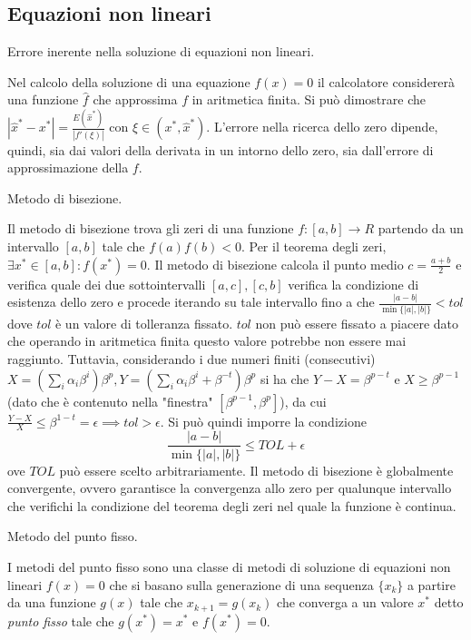 \documentclass[answers, a4paper]{exam}
\begin{document}
\begin{questions}
\section{Equazioni non lineari}
	\question Errore inerente nella soluzione di equazioni non lineari.
	\begin{solution}
		Nel calcolo della soluzione di una equazione $f(x) = 0$ il calcolatore considererà una funzione $\hat{f}$ che approssima $f$ in aritmetica finita. 
		Si può dimostrare che $|\hat{x}^* - x^*| = \frac{E(\hat{x}^*)}{|f'(\xi)|} $ con $\xi \in (x^*, \hat{x}^*)$.
		L'errore nella ricerca dello zero dipende, quindi, sia dai valori della derivata in un intorno dello zero, sia dall'errore di approssimazione della $f$. 
	\end{solution}
	\question Metodo di bisezione.
	\begin{solution} Il metodo di bisezione trova gli zeri di una funzione $f: [a, b] \rightarrow R$ partendo da un intervallo $[a, b]$ tale che $f(a) f(b) < 0$. 
		Per il teorema degli zeri, $\exists x^\ast \in [a, b] : f(x^\ast) = 0$. 
		Il metodo di bisezione calcola il punto medio $c = \frac{a + b}{2}$ e verifica quale dei due sottointervalli $[a, c], [c, b]$ verifica la condizione di esistenza dello zero e procede iterando su tale intervallo fino a che $\frac{|a - b|}{\min\{|a|, |b|\}} < tol$ dove $tol$ è un valore di tolleranza fissato.
		$tol$ non può essere fissato a piacere dato che operando in aritmetica finita questo valore potrebbe non essere mai raggiunto.
		Tuttavia, considerando i due numeri finiti (consecutivi) $X = (\sum_i \alpha_i \beta^i)\beta^p, Y = (\sum_i \alpha_i \beta^i + \beta^{-t})\beta^p$ si ha che $Y - X = \beta^{p - t}$ e $X \geq \beta^{p-1}$ (dato che è contenuto nella "finestra" $[\beta^{p-1}, \beta^p]$), da cui $\frac{Y - X}{X} \leq \beta^{1 - t} = \epsilon \implies tol > \epsilon$.
		Si può quindi imporre la condizione 
		\begin{equation}
		\frac{|a - b|}{\min\{|a|, |b|\}} \leq  TOL + \epsilon
		\end{equation} ove $TOL$ può essere scelto arbitrariamente. 
		Il metodo di bisezione è globalmente convergente, ovvero garantisce la convergenza allo zero per qualunque intervallo che verifichi la condizione del teorema degli zeri nel quale la funzione è continua. 
	\end{solution}
	\question Metodo del punto fisso.
	\begin{solution}
		I metodi del punto fisso sono una classe di metodi di soluzione di equazioni non lineari $f(x) = 0$ che si basano sulla generazione di una sequenza $\{x_k\}$ a partire da una funzione $g(x)$ tale che $x_{k+1} = g(x_k)$ che converga a un valore $x^\ast$ detto \textit{punto fisso} tale che $g(x^\ast) = x^\ast$ e $f(x^\ast) = 0$. 

\end{solution}
\end{questions}
\end{document}
